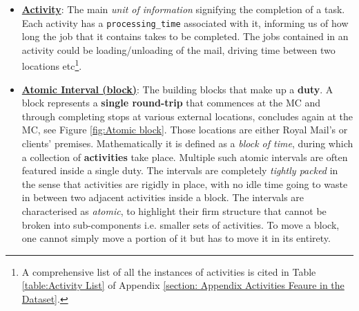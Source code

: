 \begin{itemize}
    \item \underline{\textbf{Activity}}: The main \textit{unit of information} signifying the completion of a task.  Each activity has a \texttt{processing\_time} associated with it, informing us of how long the job that it contains takes to be completed. The jobs contained in an activity could be loading/unloading of the mail, driving time between two locations etc\footnote{A comprehensive list of all the instances of activities is cited in Table \ref{table:Activity List} of Appendix \ref{section: Appendix Activities Feaure in the Dataset}.}.
    
    \item \underline{\textbf{Atomic Interval (block)}}: The building blocks that make up a \textbf{duty}. A block represents a \textbf{single round-trip} that commences at the MC and through completing stops at various external locations, concludes again at the MC, see Figure \ref{fig:Atomic block}. Those locations are either Royal Mail's or clients' premises. Mathematically it is defined as a \textit{block of time}, during which a collection of \textbf{activities} take place. Multiple such atomic intervals are often featured inside a single duty. The intervals are completely \textit{tightly packed} in the sense that activities are rigidly in place, with no idle time going to waste in between two adjacent activities inside a block. The intervals are characterised as \textit{atomic}, to highlight their firm structure that cannot be broken into sub-components i.e. smaller sets of activities. To move a block, one cannot simply move a portion of it but has to move it in its entirety. 
\end{itemize}



